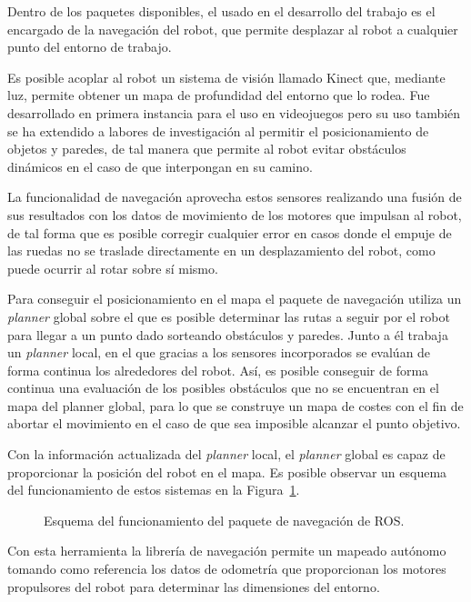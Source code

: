 Dentro de los paquetes disponibles, el usado en el desarrollo del trabajo es el encargado de la navegación del robot, que permite desplazar al robot a cualquier punto del entorno de trabajo.

Es posible acoplar al robot un sistema de visión llamado Kinect que, mediante luz, permite obtener un mapa de profundidad del entorno que lo rodea.
Fue desarrollado en primera instancia para el uso en videojuegos pero su uso también se ha extendido a labores de investigación al permitir el posicionamiento de objetos y paredes, de tal manera que permite al robot evitar obstáculos dinámicos en el caso de que interpongan en su camino.

La funcionalidad de navegación aprovecha estos sensores realizando una fusión de sus resultados con los datos de movimiento de los motores que impulsan al robot, de tal forma que es posible corregir cualquier error en casos donde el empuje de las ruedas no se traslade directamente en un desplazamiento del robot, como puede ocurrir al rotar sobre sí mismo.

Para conseguir el posicionamiento en el mapa el paquete de navegación utiliza un \textit{planner} global sobre el que es posible determinar las rutas a seguir por el robot para llegar a un punto dado sorteando obstáculos y paredes.
Junto a él trabaja un \textit{planner} local, en el que gracias a los sensores incorporados se evalúan de forma continua los alrededores del robot.
Así, es posible conseguir de forma continua una evaluación de los posibles obstáculos que no se encuentran en el mapa del planner global, para lo que se construye un mapa de costes con el fin de abortar el movimiento en el caso de que sea imposible alcanzar el punto objetivo.

Con la información actualizada del \textit{planner} local, el \textit{planner} global es capaz de proporcionar la posición del robot en el mapa.
Es posible observar un esquema del funcionamiento de estos sistemas en la Figura~\ref{fig:move_base}.

\begin{figure}[H]
    \centering
    \def\svgwidth{0.8\linewidth}
    
	\caption{Esquema del funcionamiento del paquete de navegación de ROS.}
    \label{fig:move_base}
\end{figure}

Con esta herramienta la librería de navegación permite un mapeado autónomo tomando como referencia los datos de odometría que proporcionan los motores propulsores del robot para determinar las dimensiones del entorno.

